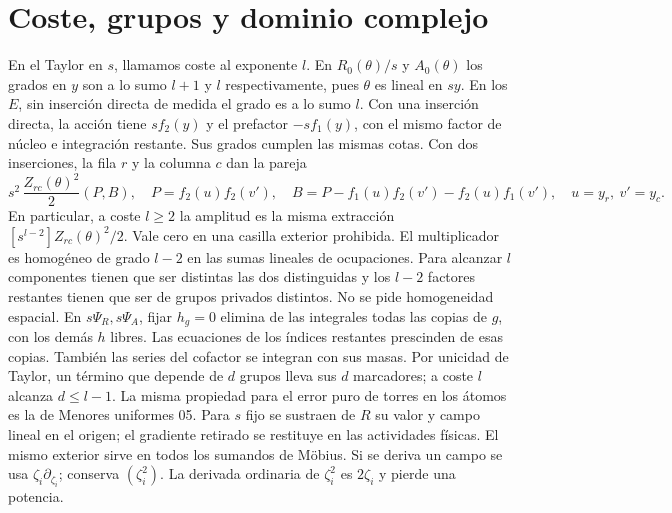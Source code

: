 \section{Coste, grupos y dominio complejo}
En el Taylor en $s$, llamamos coste al exponente $l$. En $R_0(\theta)/s$ y $A_0(\theta)$
los grados en $y$ son a lo sumo $l+1$ y $l$ respectivamente, pues $\theta$ es lineal en $s y$.
En los $E$, sin inserción directa de medida el grado es a lo sumo $l$.
Con una inserción directa, la acción tiene $s f_2(y)$ y el prefactor $-s f_1(y)$,
con el mismo factor de núcleo e integración restante. Sus grados cumplen las mismas cotas.
Con dos inserciones, la fila $r$ y la columna $c$ dan la pareja
\[
 s^2\,\frac{Z_{rc}(\theta)^2}{2}(P,B),\quad
 P=f_2(u)f_2(v'),\quad B=P-f_1(u)f_2(v')-f_2(u)f_1(v'),\quad
 u=y_r,\ v'=y_c .
\]
En particular, a coste $l\ge2$ la amplitud es la misma extracción
$[s^{l-2}]Z_{rc}(\theta)^2/2$. Vale cero en una casilla exterior prohibida.
El multiplicador es homogéneo de grado $l-2$ en las sumas lineales de ocupaciones.
Para alcanzar $l$ componentes tienen que ser distintas las dos distinguidas y los $l-2$
factores restantes tienen que ser de grupos privados distintos. No se pide homogeneidad espacial.
En $s\Psi_R,s\Psi_A$, fijar $h_g=0$ elimina de las integrales todas las copias de $g$,
con los demás $h$ libres. Las ecuaciones de los índices restantes prescinden de esas copias.
También las series del cofactor se integran con sus masas. Por unicidad de Taylor, un
término que depende de $d$ grupos lleva sus $d$ marcadores; a coste $l$ alcanza $d\le l-1$.
La misma propiedad para el error puro de torres en los átomos es la de Menores uniformes 05.
Para $s$ fijo se sustraen de $R$ su valor y campo lineal en el origen; el gradiente retirado
se restituye en las actividades físicas. El mismo exterior sirve en todos los sumandos de Möbius.
Si se deriva un campo se usa $\zeta_i\partial_{\zeta_i}$; conserva $(\zeta_i^2)$.
La derivada ordinaria de $\zeta_i^2$ es $2\zeta_i$ y pierde una potencia.

